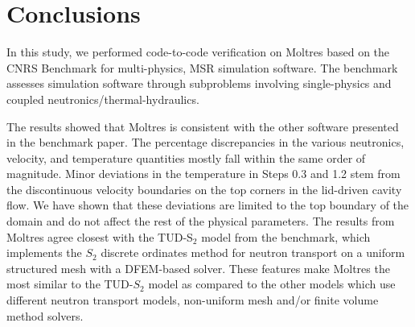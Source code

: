 \section{Conclusions}

In this study, we performed code-to-code verification on Moltres based on the
CNRS Benchmark \citep{tiberga_results_2020} for multi-physics,
\gls{MSR} simulation software. The benchmark assesses simulation
software through subproblems involving single-physics and coupled
neutronics/thermal-hydraulics.

The results showed that Moltres is consistent with the other software
presented in the benchmark paper. The percentage discrepancies in the various
neutronics, velocity, and temperature quantities mostly fall within the same
order of magnitude. Minor deviations in the temperature in Steps 0.3 and 1.2 
stem from the discontinuous velocity
boundaries on the top corners in the lid-driven cavity flow. We have shown that
these deviations are limited to the top boundary of the domain and do not
affect the rest of the physical parameters. The results from
Moltres agree closest with the TUD-S$_2$ model
from the benchmark, which implements the $S_2$ discrete ordinates method for
neutron transport on a uniform structured mesh with a \gls{DFEM}-based solver.
These features make Moltres the most similar to the TUD-$S_2$ model as compared
to the other models which use different neutron transport models, non-uniform
mesh and/or finite volume method solvers.

\FloatBarrier
